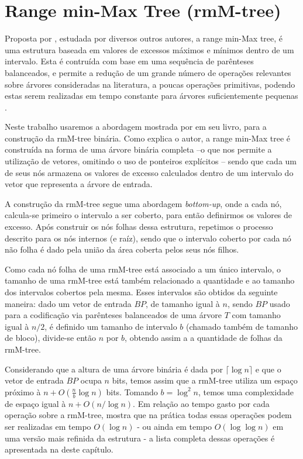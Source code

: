 \section{Range min-Max Tree (rmM-tree)}\label{sec:sec-classic-rmm-tree}
Proposta por \citet{paper-fully-functinal-succint-trees}, estudada por diversos outros autores, a range min-Max tree, é uma estrutura baseada em valores de excessos máximos e mínimos dentro de um intervalo. Esta é contruída com base em uma sequência de parênteses balanceados, e permite a redução de um grande número de operações relevantes sobre árvores consideradas na literatura, a poucas operações primitivas, podendo estas serem realizadas em tempo constante para árvores suficientemente pequenas \citep{paper-fully-functinal-succint-trees}.

Neste trabalho usaremos a abordagem mostrada por \citet{book-compact-data-structures} em seu livro, para a construção da rmM-tree binária. Como explica o autor, a range min-Max tree é construída na forma de uma árvore binária completa --o que nos permite a utilização de vetores, omitindo o uso de ponteiros explícitos -- sendo que cada um de seus nós armazena os valores de excesso calculados dentro de um intervalo do vetor que representa a árvore de entrada. 

A construção da rmM-tree segue uma abordagem \textit{bottom-up}, onde a cada nó, calcula-se primeiro o intervalo a ser coberto, para então definirmos os  valores de excesso. Após construir os nós folhas dessa estrutura, repetimos o processo descrito para os nós internos (e raíz), sendo que o intervalo coberto por cada nó não folha é dado pela união da área coberta pelos seus nós filhos.

Como cada nó folha de uma rmM-tree está associado a um único intervalo, o tamanho de uma rmM-tree está também relacionado a quantidade e ao tamanho dos intervalos cobertos pela mesma. 
Esses intervalos são obtidos da seguinte maneira: dado um vetor de entrada $BP$, de  tamanho igual à $n$, sendo $BP$ usado para a codificação via parênteses balanceados de uma árvore $T$ com tamanho igual à $n/2$, é definido um tamanho de intervalo $b$ (chamado também de tamanho de bloco), divide-se então $n$ por $b$, obtendo assim a a quantidade de folhas da rmM-tree.

Considerando que a altura de uma árvore binária é dada por $\lceil \log n \rceil$ e que o vetor de entrada $BP$ ocupa $n$ bits, temos assim que a rmM-tree utiliza um espaço próximo à $n + O(\frac{n}{b} \log n)$ bits. Tomando $b = \log^2 n$, temos uma complexidade de espaço igual à $n + O(n/\log n)$. Em relação ao tempo gasto por cada operação sobre a rmM-tree,  \citet{book-compact-data-structures} mostra que na prática todas essas operações podem ser realizadas em tempo $O(\log n)$ - ou ainda em tempo $O(\log \log n)$ em uma versão mais refinida da estrutura - a lista completa dessas operações é apresentada na  deste capítulo.

